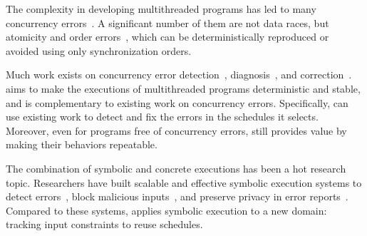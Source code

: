  The complexity in developing multithreaded
programs has led to many concurrency errors~\cite{lu:concurrency-bugs}.  A
significant number of them are not data races, but atomicity and order
errors~\cite{lu:concurrency-bugs}, which can be deterministically
reproduced or avoided using only synchronization orders.

Much work exists on concurrency error
detection~\cite{yu:racetrack:sosp,savage:eraser,racerx:sosp03,lu:muvi:sosp,
avio:asplos06,conmem:asplos10},
diagnosis~\cite{racefuzzer:pldi08,ctrigger:asplos09,atomfuzzer:fse08}, and
correction~\cite{dimmunix:osdi08,gadara:osdi08}.  \tern aims to make the
executions of multithreaded programs deterministic and stable, and is
complementary to existing work on concurrency errors.  Specifically,
\tern can use existing work to detect and fix the errors in the schedules
it selects.  Moreover, even for programs free of concurrency errors,
\tern still provides value by making their behaviors repeatable. 

 The combination of symbolic and
concrete executions has been a hot research topic.  Researchers have built
scalable and effective symbolic execution systems to detect
errors~\cite{dart:pldi,cute:fse,godefroid:grammar-fuzzing,
godefroid:whitebox-fuzzing,klee:osdi08,yang:malicious-disk:oakland06,
cadar:exe:ccs06,s2e:hotdep09,taas:socc10},
block malicious inputs~\cite{castro:bouncer}, and preserve privacy in
error reports~\cite{castro:bug-report-privacy}.  Compared to these
systems, \tern applies symbolic execution to a new domain: tracking input
constraints to reuse schedules.
